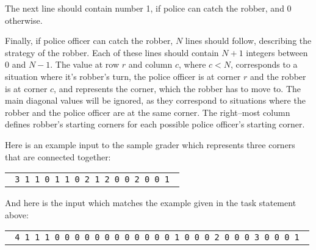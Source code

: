 \documentclass{boi2014-fi}
\begin{document}
    The next line should contain number 1, if police can catch the robber,
    and 0 otherwise.

    Finally, if police officer can catch the robber, $N$ lines should follow,
    describing the strategy of the robber.  Each of these lines should contain
    $N+1$ integers between 0 and $N-1$.  The value at row $r$ and column $c$,
    where $c < N$, corresponds to a situation where it's robber's turn, the
    police officer is at corner $r$ and the robber is at corner $c$, and
    represents the corner, which the robber has to move to.  The main diagonal
    values will be ignored, as they correspond to situations where the robber
    and the police officer are at the same corner.  The right--most column
    defines robber's starting corners for each possible police officer's
    starting corner.

    Here is an example input to the sample grader which represents three corners
    that are connected together:

    \begin{center}
        \begin{tabular}{p{4cm}}
            {\tt
                3 \newline
                0 1 1 \newline
                1 0 1 \newline
                1 1 0 \newline
                1 \newline
                0 2 1 2 \newline
                2 0 0 2 \newline
                1 0 0 1 \newline
            }
        \end{tabular}
    \end{center}

    And here is the input which matches the example given in the task statement
    above:

    \begin{center}
        \begin{tabular}{p{4cm}}
            {\tt
                4 \newline
                0 1 1 1 \newline
                1 0 0 0 \newline
                1 0 0 0 \newline
                1 0 0 0 \newline
                1 \newline
                0 0 0 0 1 \newline
                2 0 0 0 2 \newline
                3 0 0 0 3 \newline
                1 0 0 0 1 \newline
            }
        \end{tabular}
    \end{center}
\end{document}
